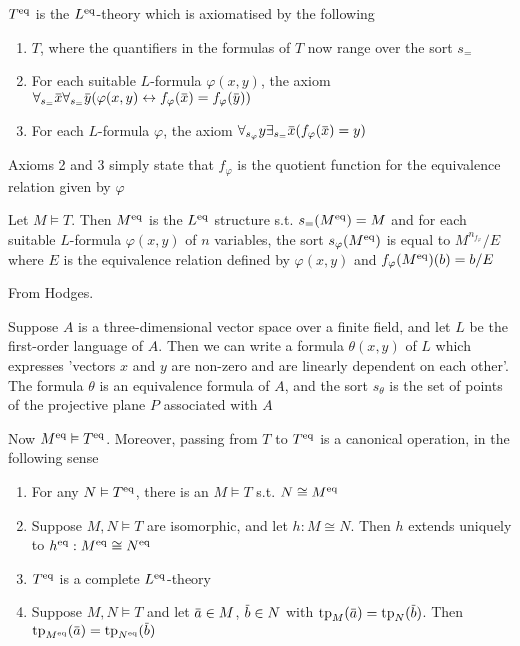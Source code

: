 \documentclass[11pt]{article}
\begin{document}
\begin{definition}[]
\(T^{\operatorname{eq}}\) is the \(L^{\operatorname{eq}}\)-theory which is axiomatised by the following
\begin{enumerate}
\item \(T\), where the quantifiers in the formulas of \(T\) now range over the sort \(s_=\)
\item For each suitable \(L\)-formula \(\varphi(x,y)\), the axiom \(\forall_{s_=}\barx\forall_{s_=}\bary(\varphi(x,y)\leftrightarrow f_\varphi(\barx)=f_\varphi(\bary))\)
\item For each \(L\)-formula \(\varphi\), the axiom \(\forall_{s_\varphi}y\exists_{s_=}\barx(f_\varphi(\barx)=y)\)
\end{enumerate}
\end{definition}

Axioms 2 and 3 simply state that \(f_\varphi\) is the quotient function for the equivalence relation
given by \(\varphi\)

\begin{definition}[]
Let \(M\vDash T\). Then \(M^{\operatorname{eq}}\) is the \(L^{\operatorname{eq}}\) structure s.t. \(s_=(M^{\operatorname{eq}})=M\) and for each
suitable \(L\)-formula \(\varphi(x,y)\) of \(n\) variables, the sort \(s_\varphi(M^{\operatorname{eq}})\) is equal
to \(M^{n_{f_\varphi}}/E\) where \(E\) is the equivalence relation defined by \(\varphi(x,y)\) and \(f_\varphi(M^{\operatorname{eq}})(b)=b/E\)
\end{definition}

\begin{examplle}
From Hodges.

Suppose \(A\) is a three-dimensional vector space over a finite field, and let \(L\) be the
first-order language of \(A\). Then we can write a formula \(\theta(x,y)\) of \(L\) which expresses
'vectors \(x\) and \(y\) are non-zero and are linearly dependent on each other'. The formula
\(\theta\) is an equivalence formula of \(A\), and the sort \(s_\theta\) is the set of points of the
projective plane \(P\) associated with \(A\)
\end{examplle}

Now \(M^{\operatorname{eq}}\vDash T^{\operatorname{eq}}\). Moreover, passing from \(T\) to \(T^{\operatorname{eq}}\) is a canonical operation,
in the following sense
\begin{lemma}[]
\begin{enumerate}
\item For any \(N\vDash T^{\operatorname{eq}}\), there is an \(M\vDash T\) s.t. \(N\cong M^{\operatorname{eq}}\)
\item Suppose \(M,N\vDash T\) are isomorphic, and let \(h:M\cong N\). Then \(h\) extends uniquely
to \(h^{\operatorname{eq}}:M^{\operatorname{eq}}\cong N^{\operatorname{eq}}\)
\item \(T^{\operatorname{eq}}\) is a complete \(L^{\operatorname{eq}}\)-theory
\item Suppose \(M,N\vDash T\) and let \(\bara\in M\), \(\barb\in N\) with \(\tp_M(\bara)=\tp_N(\barb)\).
Then \(\tp_{M^{\eq}}(\bara)=\tp_{N^{\eq}}(\barb)\)
\end{enumerate}
\end{lemma}
\end{document}
